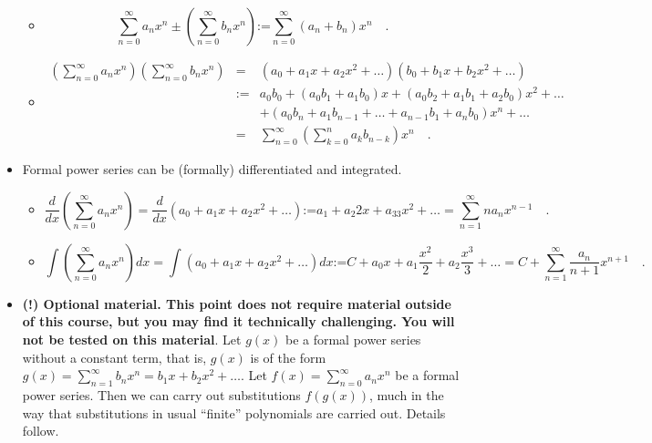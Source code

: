 \documentclass[12pt]{book}
\newcommand{\eqdef}{\textbf{:=}}
\begin{document}
\begin{itemize}
\begin{itemize}
\item 
\[
\sum_{n=0}^\infty a_n x^n\pm \left(\sum_{n=0}^\infty b_n x^n\right)\eqdef \sum_{n=0}^\infty (a_n+b_n)x^n\quad .
\]
\item
\[
\begin{array}{rcl}
\displaystyle\left(\sum_{n=0}^\infty a_n x^n\right) \left(\sum_{n=0}^\infty b_n x^n\right) &=& 
(a_0 + a_1x+a_2x^2+\dots )(b_0 + b_1x+b_2x^2+\dots )\\&\eqdef& 
a_0b_0 + (a_0b_1+a_1b_0)x + (a_0b_2+a_1b_1+a_2b_0)x^2+\dots \\
&&+(a_0 b_n +a_1b_{n-1}+\dots + a_{n-1}b_1 +a_nb_0 )x^n+\dots \\
&=&\displaystyle \sum_{n=0}^{\infty} \left(\sum_{k=0}^n a_k b_{n-k}  \right)x^n\quad .
\end{array}
\] 
\end{itemize}
\item Formal power series can be (formally) differentiated and integrated.
\begin{itemize}
\item 
\[
\frac{d}{dx}\left(\sum_{n=0}^{\infty} a_n x^n\right) =\frac{d}{dx} \left(a_0 +a_1x+a_2x^2+\dots \right)\eqdef a_1+a_2 2x+ a_33x^2+\dots= \sum_{n=1}^{\infty} na_nx^{n-1}\quad .
\]
\item 
\[
\int \left(\sum_{n=0}^{\infty} a_n x^n\right)dx = \int (a_0 +a_1x+a_2x^2+\dots )dx\eqdef C+ a_0x +a_1\frac{x^2}{2}+a_2\frac{x^3}3+\dots 
=C+\sum_{n=1}^{\infty} \frac{a_n}{n+1}x^{n+1}\quad . 
\]
\end{itemize}
\item \textbf{(!) Optional material. This point does not require material outside of this course, but you may find it technically challenging. You will not be tested on this material}. Let $g(x)$ be a formal power series without a constant term, that is, $g(x)$ is of the form $g(x)=\sum_{n=1}^\infty b_n x^n=  b_1x+b_2x^2+\dots$. Let $f(x)=\sum_{n=0}^{\infty} a_n x^n$ be a formal power series. Then we can carry out substitutions $f(g(x))$, much in the way that substitutions in usual ``finite'' polynomials are carried out. Details follow.


\end{itemize}
\end{document}

